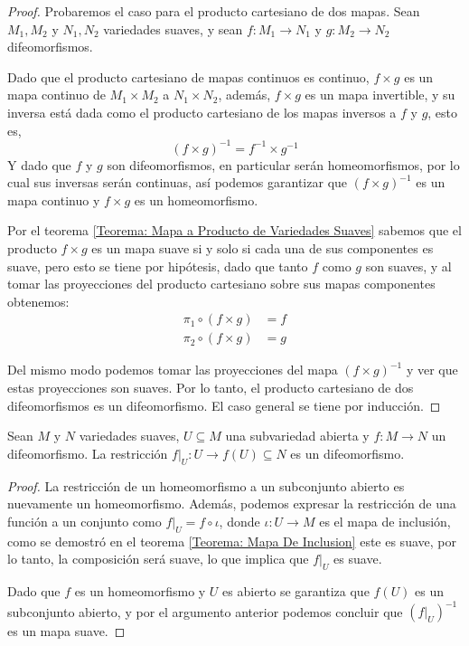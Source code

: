 \begin{proof}
  Probaremos el caso para el producto cartesiano de dos mapas. Sean $M_1, M_2$ y $N_1, N_2$ variedades suaves, y sean $f: M_1 \to N_1$ y $g: M_2 \to N_2$ difeomorfismos.

  Dado que el producto cartesiano de mapas continuos es continuo, $f \times g$ es un mapa continuo de $M_1 \times M_2$ a $N_1 \times N_2$, además, $f \times g$ es un mapa invertible, y su inversa está dada como el producto cartesiano de los mapas inversos a $f$ y $g$, esto es,
  \[
    (f \times g)^{-1} = f^{-1} \times g^{-1}
  \]
  Y dado que $f$ y $g$ son difeomorfismos, en particular serán homeomorfismos, por lo cual sus inversas serán continuas, así podemos garantizar que $(f \times g)^{-1}$ es un mapa continuo y $f \times g$ es un homeomorfismo.


  Por el teorema \ref{Teorema: Mapa a Producto de Variedades Suaves} sabemos que el producto $f \times g$ es un mapa suave si y solo si cada una de sus componentes es suave, pero esto se tiene por hipótesis, dado que tanto $f$ como $g$ son suaves, y al tomar las proyecciones del producto cartesiano sobre sus mapas componentes obtenemos:
  \begin{align*}
    \pi_1 \circ (f \times g) &= f \\
    \pi_2 \circ (f \times g) &= g
  \end{align*}

  Del mismo modo podemos tomar las proyecciones del mapa $(f \times g)^{-1}$ y ver que estas proyecciones son suaves. Por lo tanto, el producto cartesiano de dos difeomorfismos es un difeomorfismo. El caso general se tiene por inducción.
\end{proof}

\begin{theorem}
  Sean $M$ y $N$ variedades suaves, $U \subseteq M$ una subvariedad abierta y $f: M \to N$ un difeomorfismo. La restricción $f|_{U}: U \to f(U) \subseteq N$ es un difeomorfismo.
\end{theorem}

\begin{proof}
  La restricción de un homeomorfismo a un subconjunto abierto es nuevamente un homeomorfismo. Además, podemos expresar la restricción de una función a un conjunto como $f|_U = f \circ \iota$, donde $\iota: U \to M$ es el mapa de inclusión, como se demostró en el teorema \ref{Teorema: Mapa De Inclusion} este es suave, por lo tanto, la composición será suave, lo que implica que $f|_U$ es suave.

  Dado que $f$ es un homeomorfismo y $U$ es abierto se garantiza que $f(U)$ es un subconjunto abierto, y por el argumento anterior podemos concluir que $(f|_U)^{-1}$ es un mapa suave.
\end{proof}

